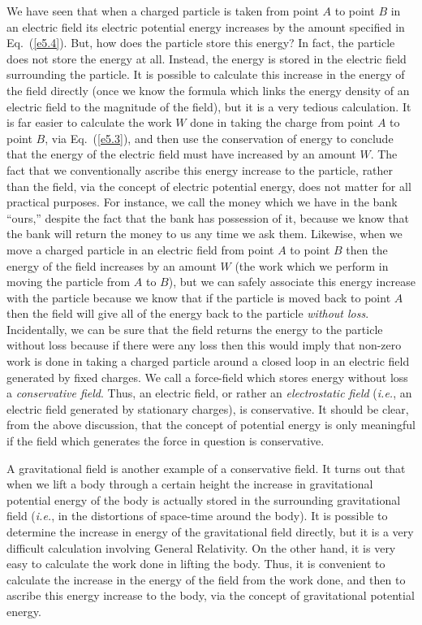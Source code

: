 We have seen that when a charged particle is taken from point $A$ to point $B$ in an electric field its electric potential energy increases by the amount specified
in Eq.~(\ref{e5.4}). But, how does the particle store this energy? In fact, the particle
does not store the energy at all. Instead, the energy is stored in the electric field
surrounding the particle. It is possible to calculate this increase in the
energy of the field directly (once we know the formula which links the energy density
of an electric field to the magnitude of the field), but it is a very tedious 
calculation. It is far easier to calculate the work $W$ done in taking the
charge from point $A$ to point $B$, via Eq.~(\ref{e5.3}), and then use the
conservation of energy to conclude that the energy of the electric field must
have increased by an amount $W$. The fact that we conventionally ascribe this energy
increase to the particle, rather than the field, via the concept of electric
potential energy, does not matter for all practical purposes. For instance, we call the
money which we have in the bank ``ours,'' despite the fact that the bank has possession of it,
because we know that the bank will return the money  to us any time we ask them. 
Likewise, when we move a charged particle in an
electric field from point $A$ to point $B$ then the energy of the field increases by an amount $W$
(the work which we perform in moving the particle from $A$ to $B$), but we can
safely  associate
this energy increase with the particle because we know that if the particle is
moved back to point $A$ then the field will give all of the
energy back to the particle {\em without loss}. Incidentally, we can be sure that
the field returns the energy  to the particle without loss because if there
were any loss then this would imply that non-zero work is done in taking a charged
particle around a closed loop in an electric field generated by fixed charges. We call a force-field which
stores energy without loss a {\em conservative field}. Thus, an electric field, or rather
an {\em electrostatic field}\/ ({\em i.e.}, an electric field generated by
stationary charges), is  conservative. It should be clear, from the above
discussion, that the concept of potential energy is only meaningful if the field
which generates the force in question is conservative. 

A gravitational field is another example of a conservative field. It turns out
that when we lift a body through a certain height the increase in gravitational
potential energy of the body is actually stored in the surrounding
gravitational field ({\em i.e.}, in the distortions of space-time around the
body). It is possible to determine the increase in energy of the gravitational
field directly, but it is a very difficult 
calculation involving General Relativity. 
On the other hand, it is very easy to calculate the work done in lifting the body. 
Thus, it is convenient to calculate the increase in the energy
of the field  from the work done, and
then to ascribe this energy increase to the body, via the concept of
gravitational potential energy. 

